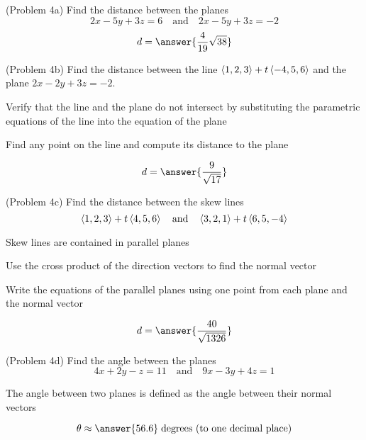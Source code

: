 \documentclass[handout]{ximera}
\begin{document}
\begin{problem}(Problem 4a)
Find the distance between the planes 
\[
2x -5y + 3z = 6 \quad \text{and} \quad 2x-5y+3z = -2
\]
\[
d = \answer{\frac{4}{19}\sqrt{38}}
\]
\end{problem}

\begin{problem}(Problem 4b)
Find the distance between the line $\left\langle 1, 2, 3\right\rangle + t\left\langle -4, 5, 6\right\rangle$ and the plane $2x-2y+3z = -2$.\\
\begin{hint}
Verify that the line and the plane do not intersect by substituting the parametric equations 
of the line into the equation of the plane
\end{hint}
\begin{hint}
Find any point on the line and compute its distance to the plane
\end{hint}
\[
d = \answer{\frac{9}{\sqrt{17}}}
\]
\end{problem}

\begin{problem}(Problem 4c)
Find the distance between the skew lines 
\[
\left\langle 1, 2, 3\right\rangle + t\left\langle 4, 5, 6\right\rangle\quad \text{and} \quad \left\langle 3, 2, 1\right\rangle + t\left\langle 6, 5, -4\right\rangle
\]
\begin{hint}
Skew lines are contained in parallel planes
\end{hint}
\begin{hint}
Use the cross product of the direction vectors to find the normal vector
\end{hint}
\begin{hint}
Write the equations of the parallel planes using one point from each plane and the normal vector
\end{hint}
\[
d = \answer{\frac{40}{\sqrt{1326}}}
\]
\end{problem}

\begin{problem}(Problem 4d)
Find the angle between the planes
\[
4x + 2y - z = 11 \quad \text{and} \quad 9x - 3y + 4z = 1
\]
\begin{hint}
The angle between two planes is defined as the angle between their normal vectors
\end{hint}
\[
\theta \approx \answer{56.6} \; \text{degrees (to one decimal place)}
\]
\end{problem}
\end{document}
